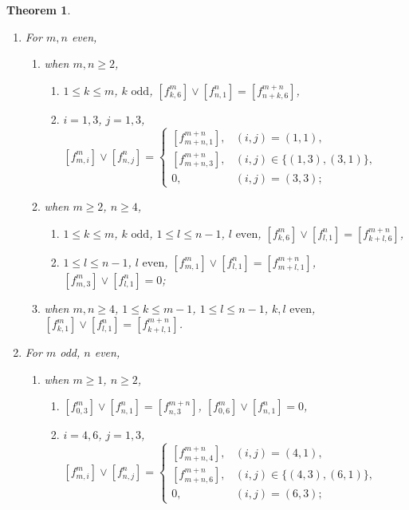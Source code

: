 \documentclass[10pt, reqno]{amsart}
\newtheorem{theorem}{Theorem}[section]
\theoremstyle{definition}
\theoremstyle{remark}
\numberwithin{equation}{section}
\begin{document}
\begin{theorem}
\begin{enumerate}
        \item For \(m, n \) even,
            \begin{enumerate}
            \item when \(m,n\ge 2\), 
            \begin{enumerate}
   \item \(1\le k\le m\), \(k\text{ odd}\),
    $[f_{k,6}^m]\lor[f_{n,1}^n]= [f_{n+k,6}^{m+n}]$,

    \item \(i=1,3\), \(j=1,3\),
   $[f_{m,i}^m]\lor[f_{n,j}^n]=
    \begin{cases}
    [f_{m+n,1}^{m+n}], & (i,j)=(1,1),\\[2pt]
    [f_{m+n,3}^{m+n}], & (i,j)\in\{(1,3),(3,1)\},\\[2pt]
    0, & (i,j)=(3,3);
    \end{cases}$
            \end{enumerate}
            
           \item when \(m\ge 2\), \(n\ge 4\),  
           \begin{enumerate}
    \item \(1\le k\le m\), \(k\text{ odd}\), \(1\le l\le n-1\), \(l\text{ even}\),
    \([f_{k,6}^m]\lor[f_{l,1}^n]=[f_{k+l,6}^{m+n}]\),

    \item \(1\le l\le n-1\), \(l\text{ even}\), $[f_{m,1}^m]\lor[f_{l,1}^n]=[f_{m+l,1}^{m+n}]$,
    $[f_{m,3}^m]\lor[f_{l,1}^n]=0$;
           \end{enumerate}
           
           \item when \(m,n\ge 4\),   \(1\le k\le m-1\), \(1\le l\le n-1\), \(k,l\text{ even}\),
    \([f_{k,1}^m]\lor[f_{l,1}^n]=[f_{k+l,1}^{m+n}]\).
\end{enumerate}
            
        \item For \(m\) odd, \(n\) even,
\begin{enumerate}
    \item when \(m\ge1\), \(n\ge 2\),
    \begin{enumerate}
        \item $[f_{0,3}^m]\lor[f_{n,1}^n]=[f_{n,3}^{m+n}]$,
       $[f_{0,6}^m]\lor[f_{n,1}^n]= 0$,
        \item \(i=4,6\), \(j=1,3\),
        $[f_{m,i}^m]\lor[f_{n,j}^n]=
        \begin{cases}
            [f_{m+n,4}^{m+n}], & (i,j)=(4,1),\\[2pt]
            [f_{m+n,6}^{m+n}], & (i,j)\in\{(4,3),(6,1)\},\\[2pt]
            0, & (i,j)=(6,3);
        \end{cases}$
    \end{enumerate}


\end{enumerate}
\end{enumerate}
\end{theorem}
\end{document}
